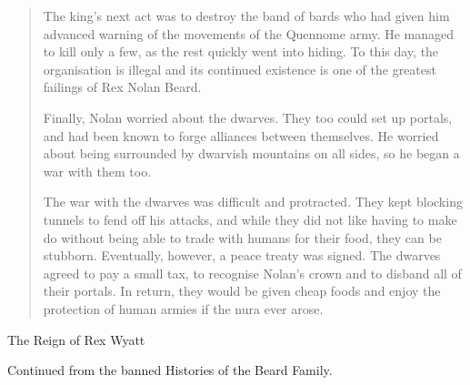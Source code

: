 \begin{quotation}
	The king's next act was to destroy the band of bards who had given him advanced warning of the movements of the Quennome army.  He managed to kill only a few, as the rest quickly went into hiding.  To this day, the organisation is illegal and its continued existence is one of the greatest failings of Rex Nolan Beard.

	Finally, Nolan worried about the dwarves.  They too could set up portals, and had been known to forge alliances between themselves.  He worried about being surrounded by dwarvish mountains on all sides, so he began a war with them too.

	The war with the dwarves was difficult and protracted.  They kept blocking tunnels to fend off his attacks, and while they did not like having to make do without being able to trade with humans for their food, they can be stubborn.  Eventually, however,  a peace treaty was signed.  The dwarves agreed to pay a small tax, to recognise Nolan's crown and to disband all of their portals.  In return, they would be given cheap foods and enjoy the protection of human armies if the nura ever arose.

\end{quotation}

The Reign of Rex Wyatt

Continued from the banned Histories of the Beard Family.

